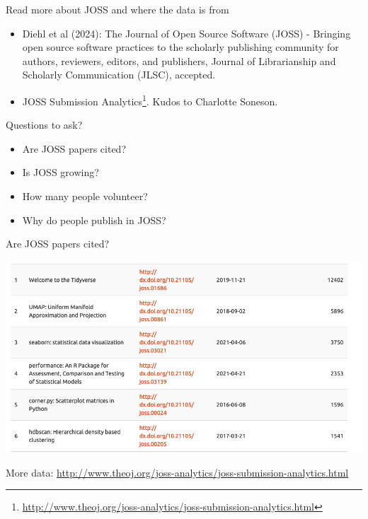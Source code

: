 \begin{frame}{Read more about JOSS and where the data is from}

\begin{itemize}
\item Diehl et al (2024): The Journal of Open Source Software (JOSS) - Bringing open source software practices to the scholarly publishing community for authors, reviewers, editors, and publishers, Journal of Librarianship and Scholarly Communication (JLSC), accepted.
\item JOSS Submission Analytics\footnote{\tiny\url{http://www.theoj.org/joss-analytics/joss-submission-analytics.html}}. Kudos to Charlotte Soneson.
\end{itemize}
\begin{block}{Questions to ask?}
\begin{itemize}
\item Are JOSS papers cited?
\item Is JOSS growing?
\item How many people volunteer?
\item Why do people publish in JOSS?
\end{itemize}
\end{block}

\end{frame}


\begin{frame}{Are JOSS papers cited?}

\includegraphics[width=\linewidth]{most-cited.png}

{\tiny More data: \url{http://www.theoj.org/joss-analytics/joss-submission-analytics.html}}    
\end{frame}

